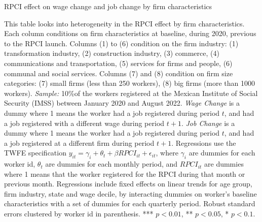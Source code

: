 \documentclass[oneside,11pt]{article}
\begin{document}
\clearpage

\begin{landscape}

\begin{table}[H]
    \caption{RPCI effect on wage change and job change by firm characteristics}
    \label{twfe_change_hetero_firm_char}
    \begin{center}
    \scriptsize{}
    \end{center}
\end{table}
\scriptsize{
\noindent This table looks into heterogeneity in the RPCI effect by firm characteristics. Each column conditions on firm characteristics at baseline, during 2020, previous to the RPCI launch. Columns (1) to (6) condition on the firm industry: (1) transformation industry, (2) construction industry, (3) commerce, (4) communications and transportation, (5) services for firms and people, (6) communal and social services. Columns (7) and (8) condition on firm size categories: (7) small firms (less than 250 workers), (8) big firms (more than 1000 workers). \textit{Sample:} 10\%of the workers registered at the Mexican Institute of Social Security (IMSS) between January 2020 and August 2022. \textit{Wage Change} is a dummy where 1 means the worker had a job registered during period $t$, and had a job registered with a different wage during period $t+1$. \textit{Job Change} is a dummy where 1 means the worker had a job registered during period $t$, and had a job registered at a different firm during period $t+1$. Regressions use the TWFE specification $y_{it} = \gamma_{i} + \theta_{t}+ \beta RPCI_{it} +\epsilon_{it}$, where $\gamma_{i}$ are dummies for each worker id, $\theta_{t}$ are dummies for each monthly period, and $RPCI_{it}$ are dummies where 1 means that the worker registered for the RPCI during that month or previous month. Regressions include fixed effects on linear trends for age group, firm industry, state and wage decile, by interacting dummies on worker's baseline characteristics with a set of dummies for each quarterly period. Robust standard errors clustered by worker id in parenthesis. *** $p<0.01$, ** $p<0.05$, * $p<0.1$.
}

\end{landscape}

\clearpage
\end{document}
